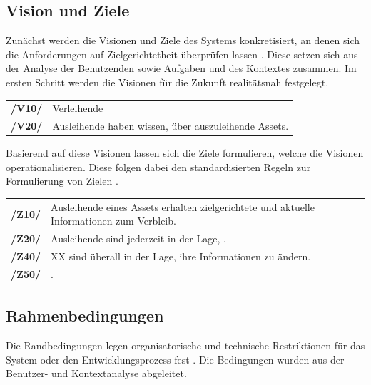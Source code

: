 \subsection*{Vision und Ziele}
\label{section:visionziel}
Zunächst werden die Visionen und Ziele des Systems konkretisiert, an denen sich die Anforderungen
auf Zielgerichtetheit überprüfen lassen \cite{balzert2009}. Diese setzen sich aus der Analyse der
Benutzenden sowie Aufgaben und des Kontextes zusammen. Im ersten Schritt werden die Visionen für die
Zukunft realitätsnah festgelegt.



\begin{center}
        \renewcommand{\arraystretch}{1.5}
        \begin{tabular}{p{}p{}}
                \hline
                \textbf{/V10/} & Verleihende \\
                \textbf{/V20/} & Ausleihende haben wissen, über auszuleihende Assets.
                \\
                \hline
        \end{tabular}
\end{center}

Basierend auf diese Visionen lassen sich die Ziele formulieren, welche die Visionen
operationalisieren. Diese folgen dabei den standardisierten Regeln zur Formulierung von Zielen
\cite{pohl_requirements_2008}.


\begin{center}
        \renewcommand{\arraystretch}{1.5}
        \begin{tabular}{p{}p{}}
                \hline
                \textbf{/Z10/} & Ausleihende eines Assets erhalten zielgerichtete und aktuelle
                Informationen zum Verbleib. \\
                \textbf{/Z20/} & Ausleihende sind jederzeit in der Lage, . \\
                \textbf{/Z40/} & XX sind überall in der Lage, ihre Informationen zu ändern.
                \\
                \textbf{/Z50/} & . \\
                \hline
        \end{tabular}
\end{center}

\subsection*{Rahmenbedingungen}
\label{section:rahmen}
Die Randbedingungen legen organisatorische und technische Restriktionen für das System oder den
Entwicklungsprozess fest \cite{balzert2009}. Die Bedingungen wurden aus der Benutzer- und
Kontextanalyse abgeleitet.


